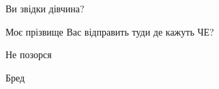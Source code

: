 \begin{itemize}
\begin{itemize}
Ви звідки дівчина?

Моє прізвище Вас відправить туди де кажуть ЧЕ?

Не позорся
\end{itemize}

Бред

\end{itemize}


